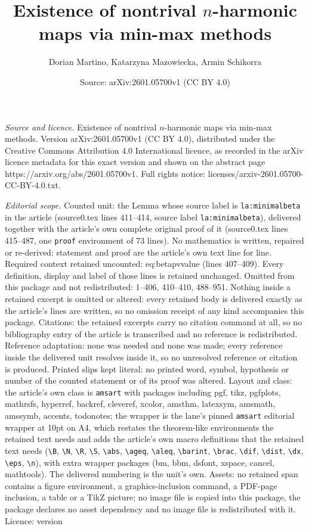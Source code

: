 \documentclass[10pt,a4paper]{amsart}
\title[Existence of nontrival $n$-harmonic maps via min-max methods]{Existence of nontrival $n$-harmonic maps via min-max methods}
\author{Dorian Martino, Katarzyna Mazowiecka, Armin Schikorra}
\date{Source: arXiv:2601.05700v1 (CC BY 4.0)}
\begin{document}
\maketitle

\noindent\emph{Source and licence.} Existence of nontrival $n$-harmonic maps via min-max methods. Version arXiv:2601.05700v1 (CC BY 4.0), distributed under the Creative Commons Attribution 4.0 International licence, as recorded in the arXiv licence metadata for this exact version and shown on the abstract page https://arxiv.org/abs/2601.05700v1. Full rights notice: licenses/arxiv-2601.05700-CC-BY-4.0.txt.\par\smallskip

\noindent\textit{Editorial scope.} Counted unit: the Lemma whose source label is \texttt{la:minimalbeta} in the article (source0.tex lines 411--414, source label \texttt{la:minimalbeta}), delivered together with the article's own complete original proof of it (source0.tex lines 415--487, one \texttt{proof} environment of 73 lines). No mathematics is written, repaired or re-derived: statement and proof are the article's own text line for line. Required context retained uncounted: eq:betapvvalue (lines 407--409). Every definition, display and label of those lines is retained unchanged. Omitted from this package and not redistributed: 1--406, 410--410, 488--951. Nothing inside a retained excerpt is omitted or altered: every retained body is delivered exactly as the article's lines are written, so no omission receipt of any kind accompanies this package. Citations: the retained excerpts carry no citation command at all, so no bibliography entry of the article is transcribed and no reference is redistributed. Reference adaptation: none was needed and none was made; every reference inside the delivered unit resolves inside it, so no unresolved reference or citation is produced. Printed slips kept literal: no printed word, symbol, hypothesis or number of the counted statement or of its proof was altered. Layout and class: the article's own class is \texttt{amsart} with packages including pgf, tikz, pgfplots, mathrsfs, hyperref, backref, cleveref, xcolor, amsthm, latexsym, amsmath, amssymb, accents, todonotes; the wrapper is the lane's pinned \texttt{amsart} editorial wrapper at 10pt on A4, which restates the theorem-like environments the retained text needs and adds the article's own macro definitions that the retained text needs (\texttt{\textbackslash B}, \texttt{\textbackslash N}, \texttt{\textbackslash R}, \texttt{\textbackslash S}, \texttt{\textbackslash abs}, \texttt{\textbackslash ageq}, \texttt{\textbackslash aleq}, \texttt{\textbackslash barint}, \texttt{\textbackslash brac}, \texttt{\textbackslash dif}, \texttt{\textbackslash dist}, \texttt{\textbackslash dx}, \texttt{\textbackslash eps}, \texttt{\textbackslash n}), with extra wrapper packages (bm, bbm, dsfont, xspace, cancel, mathtools). The delivered numbering is the unit's own. Assets: no retained span contains a figure environment, a graphics-inclusion command, a PDF-page inclusion, a table or a TikZ picture; no image file is copied into this package, the package declares no asset dependency and no image file is redistributed with it. Licence: version 
\end{document}
